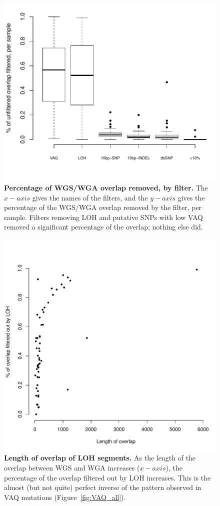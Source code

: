 \documentclass[11pt]{article} %
\begin{document}
\begin{figure}
\centerline{
\includegraphics[width=6in]{boxplot_percent_overlap_filtered.pdf} }
\caption{\textbf{Percentage of WGS/WGA overlap removed, by filter.} The $x-axis$ gives the names of the filters, and the $y-axis$ gives the percentage of the WGS/WGA overlap removed by the filter, per sample. Filters removing LOH and putative SNPs with low VAQ removed a significant percentage of the overlap; nothing else did.}
\label{fig:boxplot_percent_overlap_filtered}
\end{figure}

\begin{figure}
\centerline{
\includegraphics[width=5in]{./LOH_VAQ/LOH_all.pdf} }
\caption{\textbf{Length of overlap of LOH segments.} As the length of the overlap between WGS and WGA increases ($x-axis$), the percentage of the overlap filtered out by LOH increases. This is the almost (but not quite) perfect inverse of the pattern observed in VAQ mutations (Figure~\ref{fig:VAQ_all}).}
\label{fig:LOH_all}
\end{figure}
\end{document}

